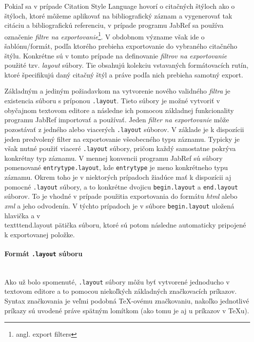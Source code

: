 \documentclass{fithesis3}
\begin{document}
	Pokiaľ sa v prípade Citation Style Language hovorí o citačných štýloch ako o štýloch, ktoré môžeme aplikovať na bibliografický záznam a vygenerovať tak citáciu a bibliografickú referenciu, v prípade programu JabRef sa používa označenie \textit{filtre na exportovanie}\footnote{angl. export filters}. V obdobnom význame však ide o šablónu/formát, podľa ktorého prebieha exportovanie do vybraného citačného štýlu. Konkrétne sú v tomto prípade na definovanie \textit{filtrov na exportovanie} použité tzv. \textit{layout} súbory. Tie obsahujú kolekciu vstavaných formátovacích rutín, ktoré špecifikujú daný citačný štýl a práve podľa nich prebieha samotný export.
	
	Základným a jediným požiadavkom na vytvorenie nového validného \textit{filtra} je existencia súboru s príponou \texttt{.layout}. Tieto súbory je možné vytvoriť v obyčajnom textovom editore a následne ich pomocou základnej funkcionality programu JabRef importovať a používať. Jeden \textit{filter na exportovanie} môže pozostávať z jedného alebo viacerých \texttt{.layout} súborov. V základe je k dispozícii jeden predvolený filter na exportovanie všeobecného typu záznamu. Typicky je však nutné použiť viaceré \texttt{.layout} súbory, pričom každý samostatne pokrýva konkrétny typ záznamu. V mennej konvencii programu JabRef sú súbory pomenované \texttt{entrytype.layout}, kde \texttt{entrytype} je meno konkrétneho typu záznamu.
	Okrem toho je v niektorých prípadoch žiadúce mať k dispozícii aj pomocné \texttt{.layout} súbory, a to konkrétne dvojicu \texttt{begin.layout} a \texttt{end.layout} súborov. To je vhodné v prípade použitia exportovania do formátu \textit{html} alebo \textit{xml} a jeho odvodenín. V týchto prípadoch je v súbore \texttt{begin.layout} uložená hlavička a v \\texttt{end.layout} pätička súboru, ktoré sú potom následne automaticky pripojené k exportovanej položke.

	\paragraph{Formát \texttt{.layout} súboru}\hfill\\
	
	Ako už bolo spomenuté, \texttt{.layout} súbory môžu byť vytvorené jednoducho v textovom editore a to pomocou niekoľkých základných značkovacích príkazov. Syntax značkovania je veľmi podobná \TeX -ovému značkovaniu, nakoľko jednotlivé príkazy sú uvodené práve spätným lomítkom (ako tomu je aj u príkazov v \TeX u).
	
\end{document}
